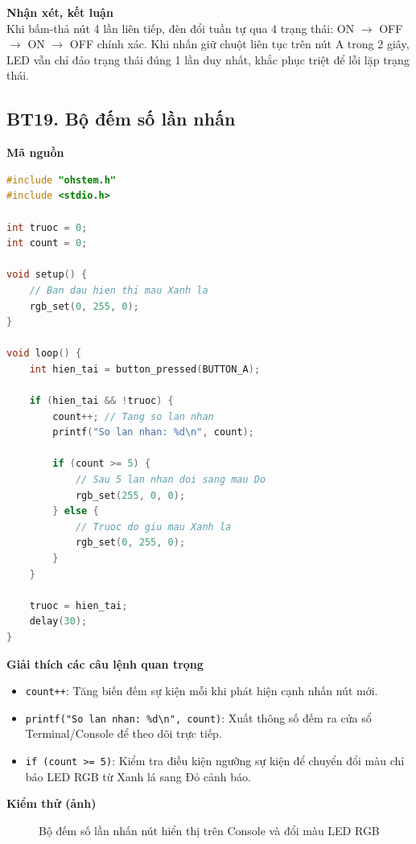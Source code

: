 \noindent\textbf{Nhận xét, kết luận}\\
Khi bấm-thả nút 4 lần liên tiếp, đèn đổi tuần tự qua 4 trạng thái: ON $\to$ OFF $\to$ ON $\to$ OFF chính xác. Khi nhấn giữ chuột liên tục trên nút A trong 2 giây, LED vẫn chỉ đảo trạng thái đúng 1 lần duy nhất, khắc phục triệt để lỗi lặp trạng thái.


\subsection*{BT19. Bộ đếm số lần nhấn}

\noindent\textbf{Mã nguồn}\\
\begin{lstlisting}[language=C]
#include "ohstem.h"
#include <stdio.h>

int truoc = 0;
int count = 0;

void setup() {
    // Ban dau hien thi mau Xanh la
    rgb_set(0, 255, 0);
}

void loop() {
    int hien_tai = button_pressed(BUTTON_A);

    if (hien_tai && !truoc) {
        count++; // Tang so lan nhan
        printf("So lan nhan: %d\n", count);

        if (count >= 5) {
            // Sau 5 lan nhan doi sang mau Do
            rgb_set(255, 0, 0);
        } else {
            // Truoc do giu mau Xanh la
            rgb_set(0, 255, 0);
        }
    }

    truoc = hien_tai;
    delay(30);
}
\end{lstlisting}

\noindent\textbf{Giải thích các câu lệnh quan trọng}\\
\begin{itemize}
    \item \texttt{count++}: Tăng biến đếm sự kiện mỗi khi phát hiện cạnh nhấn nút mới.
    \item \texttt{printf("So lan nhan: \%d\textbackslash n", count)}: Xuất thông số đếm ra cửa sổ Terminal/Console để theo dõi trực tiếp.
    \item \texttt{if (count >= 5)}: Kiểm tra điều kiện ngưỡng sự kiện để chuyển đổi màu chỉ báo LED RGB từ Xanh lá sang Đỏ cảnh báo.
\end{itemize}

\noindent\textbf{Kiểm thử (ảnh)}\\
\begin{figure}[H]
    \centering
    \caption{Bộ đếm số lần nhấn nút hiển thị trên Console và đổi màu LED RGB}
    \label{fig:bt19}
\end{figure}

